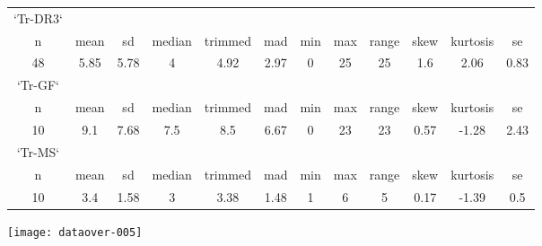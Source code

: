\documentclass{article}
\begin{document}
\begin{tabular}{c c c c c c c c c c c c }
`Tr-DR3`&&&&&&&&&&&\\
   n &mean   &sd& median &trimmed & mad &min &max &range &skew &kurtosis &  se\\
     48& 5.85 &5.78&      4    &4.92 &2.97 &  0 & 25 &   25 & 1.6  &   2.06 &0.83\\

`Tr-GF`&&&&&&&&&&&\\
  n &mean   &sd& median &trimmed & mad &min &max &range &skew &kurtosis &  se\\
     10 & 9.1 &7.68  &  7.5 &    8.5 &6.67  & 0 & 23 &   23 &0.57  &  -1.28 &2.43\\

`Tr-MS`&&&&&&&&&&&\\
  n &mean   &sd& median &trimmed & mad &min &max &range &skew &kurtosis &  se\\
    10  &3.4 &1.58 &     3  &  3.38 &1.48 &  1  & 6 &    5& 0.17 &   -1.39 &0.5\\

\end{tabular}
\newpage
\texttt{[image: dataover-005]}
\end{document}

